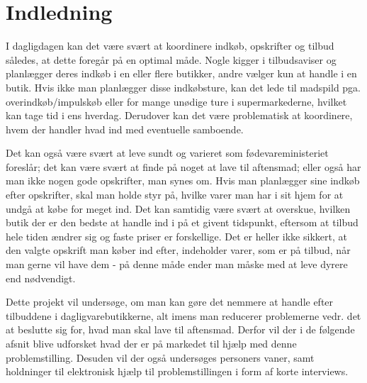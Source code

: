 \chapter{Indledning}\label{chapter:indledning}

I dagligdagen kan det være svært at koordinere indkøb, opskrifter og tilbud således, at dette foregår på en optimal måde. Nogle kigger i tilbudsaviser og planlægger deres indkøb i en eller flere butikker, andre vælger kun at handle i en butik. Hvis ikke man planlægger disse indkøbsture, kan det lede til madspild pga. overindkøb/impulskøb eller for mange unødige ture i supermarkederne, hvilket kan tage tid i ens hverdag. Derudover kan det være problematisk at koordinere, hvem der handler hvad ind med eventuelle samboende.

Det kan også være svært at leve sundt og varieret som fødevareministeriet foreslår; det kan være svært at finde på noget at lave til aftensmad; eller også har man ikke nogen gode opskrifter, man synes om.
Hvis man planlægger sine indkøb efter opskrifter, skal man holde styr på, hvilke varer man har i sit hjem for at undgå at købe for meget ind. Det kan samtidig være svært at overskue, hvilken butik der er den bedste at handle ind i på et givent tidspunkt, eftersom at tilbud hele tiden ændrer sig og faste priser er forskellige. Det er heller ikke sikkert, at den valgte opskrift man køber ind efter, indeholder varer, som er på tilbud, når man gerne vil have dem - på denne måde ender man måske med at leve dyrere end nødvendigt.

Dette projekt vil undersøge, om man kan gøre det nemmere at handle efter tilbuddene i dagligvarebutikkerne, alt imens man reducerer problemerne vedr. det at beslutte sig for, hvad man skal lave til aftensmad.
Derfor vil der i de følgende afsnit blive udforsket hvad der er på markedet til hjælp med denne problemstilling. Desuden vil der også undersøges personers vaner, samt holdninger til elektronisk hjælp til problemstillingen i form af korte interviews.
